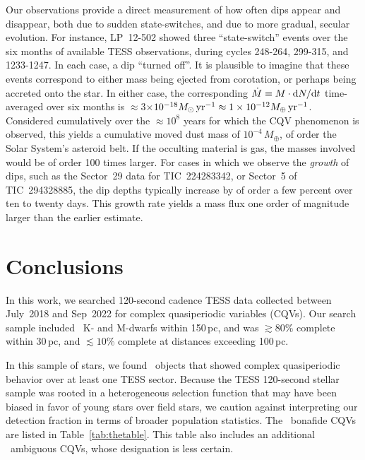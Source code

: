 \documentclass[11pt,twocolumn,tighten]{aastex63}
\begin{document}
Our observations provide a direct measurement of how often dips
appear and disappear, both due to sudden state-switches, and
due to more gradual, secular evolution.  For instance, LP~12-502
showed three ``state-switch'' events over the six months of available TESS
observations, during cycles 248-264, 299-315, and 1233-1247.  In each
case, a dip ``turned off''.  It is
plausible to imagine that these events correspond to either mass being
ejected from corotation, or perhaps being accreted onto the star.  In
either case, the corresponding $\dot{M} \equiv M\cdot {\rm d}N/{\rm d}t$
time-averaged over six months
is $\approx$3$\times$$10^{-18} M_\odot\,{\rm yr}^{-1} \approx
1\times10^{-12} M_\oplus\,{\rm yr}^{-1}$.  Considered cumulatively
over the $\approx$$10^8$ years for which the CQV phenomenon is
observed, this yields a cumulative moved dust mass of
$10^{-4}\,M_\oplus$, of order the Solar System's asteroid belt.
If the occulting material is gas, the masses involved would be of
order 100 times larger.
For cases in which we observe the {\it growth} of
dips, such as the Sector~29 data for TIC~224283342,
or Sector~5 of TIC~294328885,
the dip depths
typically increase by of order a few percent over ten to twenty days.
This growth rate yields a mass flux one order of magnitude larger
than the earlier estimate.




\section{Conclusions}
\label{sec:conclusion}

In this work, we searched 120-second cadence TESS data collected
between July~2018 and Sep~2022 for complex quasiperiodic variables
(CQVs).  Our search sample included \nstarssearched\ K- and M-dwarfs
within 150\,pc, and was $\gtrsim 80\%$ complete within 30\,pc, and
$\lesssim 10\%$ complete at distances exceeding 100\,pc.

In this sample of stars, we found \ngoods\ objects that showed complex
quasiperiodic behavior over at least one TESS sector.  Because the
TESS 120-second stellar sample was rooted in a heterogeneous selection
function that may have been biased in favor of young stars over field
stars, we caution against interpreting our detection fraction in
terms of broader population statistics.  The \ngoods\ bonafide
CQVs are listed in Table~\ref{tab:thetable}.  This table also includes
an additional \nmaybes\ ambiguous CQVs, whose designation is less
certain.
\end{document}
